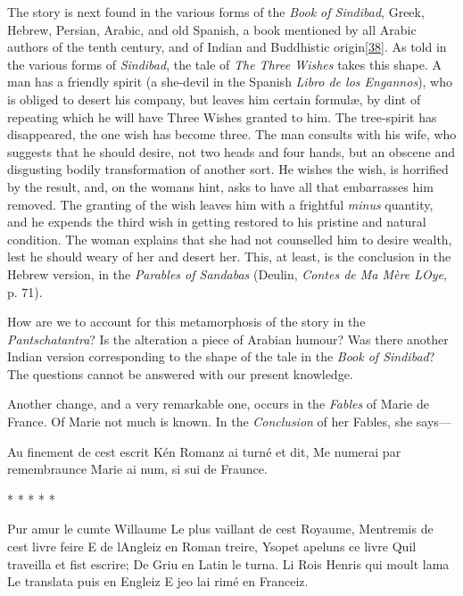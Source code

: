 \documentclass[14pt,a4paper]{memoir}
\begin{document}
The story is next found in the various forms of the \emph{Book of
Sindibad}, Greek, Hebrew, Persian, Arabic, and old Spanish, a book
mentioned by all Arabic authors of the tenth century, and of Indian and
Buddhistic
origin\protect\hypertarget{4533318093929944247_33931-h-0.htm.xhtmlux5cux23FNanchor_38}{}{}\protect\hyperlink{4533318093929944247_33931-h-0.htm.xhtmlux5cux23Footnote_38}{{[}38{]}}.
As told in the various forms of \emph{Sindibad}, the tale of \emph{The
Three Wishes} takes this shape. A man has a friendly spirit (a she-devil
in the Spanish \emph{Libro de los Engannos}), who is obliged to desert
his company, but leaves him certain formulæ, by dint of repeating which
he will have Three Wishes granted to him. The tree-spirit has
disappeared, the one wish has become three. The man consults with his
wife, who suggests that he should desire, not two heads and four hands,
but an obscene and disgusting bodily transformation of another sort. He
wishes the wish, is horrified by the result, and, on the
woman\textquotesingle s hint, asks to have all that embarrasses him
removed. The granting of the wish leaves him with \textquotesingle a
frightful \emph{minus} quantity,\textquotesingle{} and he expends the
third wish in getting restored to his pristine and natural condition.
The woman explains that she had not counselled him to desire wealth,
lest he should weary of her and desert her. This, at least, is the
conclusion in the Hebrew version, in the \emph{Parables of Sandabas}
(Deulin, \emph{Contes de Ma Mère L\textquotesingle Oye}, p. 71).

How are we to account for this metamorphosis of the story in the
\emph{Pantschatantra}? Is the alteration a piece of Arabian humour? Was
there another Indian version corresponding to the shape of the tale in
the \emph{Book of Sindibad}? The questions cannot be answered with our
present knowledge.

Another change, and a very remarkable one, occurs in the \emph{Fables}
of Marie de France. Of Marie not much is known. In the \emph{Conclusion}
of her Fables, she says---

{\textquotesingle Au finement de cest escrit} {K\textquotesingle én
Romanz ai turné et dit,} {Me numerai par remembraunce} {Marie ai num, si
sui de Fraunce.}

{* * * * *}

{Pur amur le cumte Willaume} {Le plus vaillant de cest Royaume,}
{M\textquotesingle entremis de cest livre feire} {E de
l\textquotesingle Angleiz en Roman treire,} {Ysopet apeluns ce livre}
{Qu\textquotesingle il traveilla et fist escrire;} {De Griu en Latin le
turna.} {Li Rois Henris qui moult l\textquotesingle ama} {Le translata
puis en Engleiz} {E jeo l\textquotesingle ai rimé en
Franceiz.\textquotesingle{}}
\end{document}

